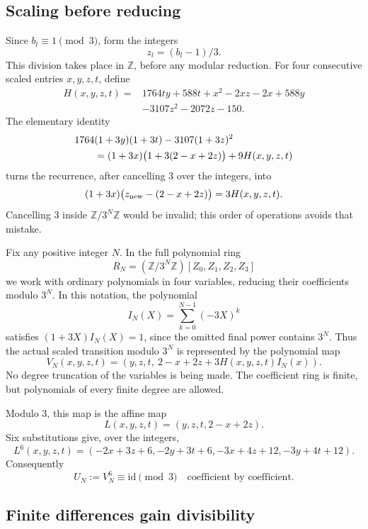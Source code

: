 \documentclass[11pt,a4paper]{article}
\theoremstyle{definition}
\newcommand{\Z}{\mathbb Z}
\begin{document}
\subsection{Scaling before reducing}

Since \(b_l\equiv1\pmod3\), form the integers
\[
 z_l=(b_l-1)/3.
\]
This division takes place in \(\Z\), before any modular reduction.
For four consecutive scaled entries \(x,y,z,t\), define
\begin{align*}
 H(x,y,z,t)={}&1764ty+588t+x^2-2xz-2x+588y\\
             &-3107z^2-2072z-150.
\end{align*}
The elementary identity
\begin{align}\label{eq:scaledidentity}
 &1764(1+3y)(1+3t)-3107(1+3z)^2\notag\\
 &\qquad=(1+3x)\bigl(1+3(2-x+2z)\bigr)+9H(x,y,z,t)
\end{align}
turns the recurrence, after cancelling \(3\) over the integers,
into
\begin{equation}\label{eq:scaledexact}
 (1+3x)\bigl(z_{\rm new}-(2-x+2z)\bigr)=3H(x,y,z,t).
\end{equation}
Cancelling \(3\) inside \(\Z/3^N\Z\) would be invalid; this
order of operations avoids that mistake.

Fix any positive integer \(N\). In the full polynomial ring
\[
 R_N=(\Z/3^N\Z)[Z_0,Z_1,Z_2,Z_3]
\]
we work with ordinary polynomials in four variables, reducing their
coefficients modulo \(3^N\). In this notation,
the polynomial
\[
 I_N(X)=\sum_{k=0}^{N-1}(-3X)^k
\]
satisfies \((1+3X)I_N(X)=1\), since the omitted final power contains
\(3^N\). Thus the actual scaled transition modulo \(3^N\) is
represented by the polynomial map
\begin{equation}\label{eq:Vmap}
 V_N(x,y,z,t)=
 (y,z,t,\ 2-x+2z+3H(x,y,z,t)I_N(x)).
\end{equation}
No degree truncation of the variables is being made. The coefficient
ring is finite, but polynomials of every finite degree are allowed.

Modulo \(3\), this map is the affine map
\[
 L(x,y,z,t)=(y,z,t,2-x+2z).
\]
Six substitutions give, over the integers,
\[
 L^6(x,y,z,t)=(-2x+3z+6,-2y+3t+6,-3x+4z+12,-3y+4t+12).
\]
Consequently
\begin{equation}\label{eq:nearidentity}
 U_N:=V_N^6\equiv\mathrm{id}\pmod3
 \quad\text{coefficient by coefficient}.
\end{equation}

\subsection{Finite differences gain divisibility}
\end{document}
